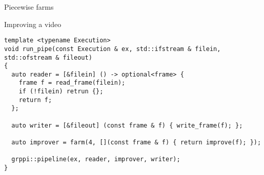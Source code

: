 \begin{frame}[t,fragile]{Piecewise farms}
\begin{block}{Improving a video}
\begin{lstlisting}
template <typename Execution>
void run_pipe(const Execution & ex, std::ifstream & filein, std::ofstream & fileout)
{
  auto reader = [&filein] () -> optional<frame> {
    frame f = read_frame(filein);
    if (!filein) retrun {};
    return f;
  };

  auto writer = [&fileout] (const frame & f) { write_frame(f); };

  auto improver = farm(4, [](const frame & f) { return improve(f); });

  grppi::pipeline(ex, reader, improver, writer);
}
\end{lstlisting}
\end{block}
\end{frame}
